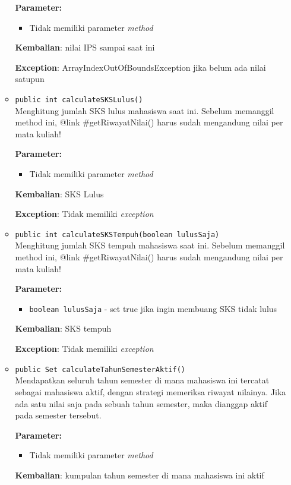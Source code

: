 \documentclass{article}
\begin{document}
\begin{enumerate}
\begin{itemize}
\textbf{Parameter:}\begin{itemize}
\item Tidak memiliki parameter \textit{method}
\end{itemize}
\textbf{Kembalian}: nilai IPS sampai saat ini

\textbf{Exception}: ArrayIndexOutOfBoundsException jika belum ada nilai satupun

\item \texttt{public int calculateSKSLulus()}\\ 
Menghitung jumlah SKS lulus mahasiswa saat ini.
 Sebelum memanggil method ini, {@link #getRiwayatNilai()} harus sudah mengandung nilai per mata kuliah!

\textbf{Parameter:}\begin{itemize}
\item Tidak memiliki parameter \textit{method}
\end{itemize}
\textbf{Kembalian}: SKS Lulus

\textbf{Exception}: Tidak memiliki \textit{exception}

\item \texttt{public int calculateSKSTempuh(boolean lulusSaja)}\\ 
Menghitung jumlah SKS tempuh mahasiswa saat ini.
 Sebelum memanggil method ini, {@link #getRiwayatNilai()} harus sudah mengandung nilai per mata kuliah!

\textbf{Parameter:}
\begin{itemize}
\item \texttt{boolean lulusSaja} - 
set true jika ingin membuang SKS tidak lulus
\end{itemize}
\textbf{Kembalian}: SKS tempuh

\textbf{Exception}: Tidak memiliki \textit{exception}

\item \texttt{public Set calculateTahunSemesterAktif()}\\ 
Mendapatkan seluruh tahun semester di mana mahasiswa ini tercatat
 sebagai mahasiswa aktif, dengan strategi memeriksa riwayat nilainya.
 Jika ada satu nilai saja pada sebuah tahun semester, maka dianggap
 aktif pada semester tersebut.

\textbf{Parameter:}\begin{itemize}
\item Tidak memiliki parameter \textit{method}
\end{itemize}
\textbf{Kembalian}: kumpulan tahun semester di mana mahasiswa ini aktif


\end{itemize}
\end{enumerate}
\end{document}
